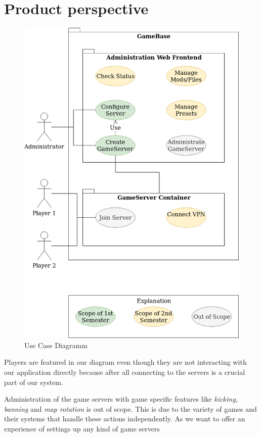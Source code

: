 \documentclass[a4paper,12pt,chapterprefix=false,bibliography=totoc,listof=totoc,]{scrreprt}
\begin{document}
\section{Product perspective}
\begin{figure}
	\includegraphics[width=\textwidth]{Use_Case_Diagramm.png}
	\caption{Use Case Diagramm}
	\label{fig:ucd}
\end{figure}
Players are featured in our diagram even though they are not interacting with our application directly because after all connecting to the servers is a crucial part of our system.

Administration of the game servers with game specific features like \emph{kicking}, \emph{banning} and \emph{map rotation} is out of scope. This is due to the variety of games and their systems that handle these actions independently. As we want to offer an experience of settings up any kind of game servers
\end{document}
